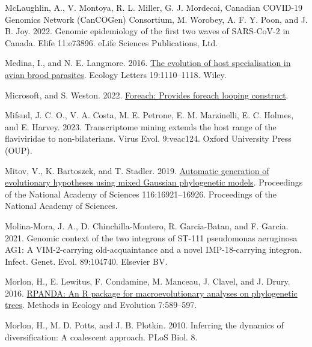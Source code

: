\documentclass[fleqn,10pt,lineno]{wlpeerj} %
\newlength{\cslhangindent}
\newlength{\cslentryspacingunit} %
\newenvironment{CSLReferences}[2] %
 {%
  \setlength{\parindent}{0pt}
  \ifodd #1
  \let\oldpar\par
  \def\par{\hangindent=\cslhangindent\oldpar}
  \fi
  \setlength{\parskip}{#2\cslentryspacingunit}
 }%
 {}
\begin{document}
\begin{CSLReferences}{1}{0}
\leavevmode{}%
McLaughlin, A., V. Montoya, R. L. Miller, G. J. Mordecai, Canadian COVID-19 Genomics Network (CanCOGen) Consortium, M. Worobey, A. F. Y. Poon, and J. B. Joy. 2022. Genomic epidemiology of the first two waves of {SARS-CoV-2} in {C}anada. Elife 11:e73896. eLife Sciences Publications, Ltd.

\leavevmode{}%
Medina, I., and N. E. Langmore. 2016. \href{https://doi.org/10.1111/ele.12649}{The evolution of host specialisation in avian brood parasites}. Ecology Letters 19:1110--1118. Wiley.

\leavevmode{}%
Microsoft, and S. Weston. 2022. \href{https://CRAN.R-project.org/package=foreach}{Foreach: Provides foreach looping construct}.

\leavevmode{}%
Mifsud, J. C. O., V. A. Costa, M. E. Petrone, E. M. Marzinelli, E. C. Holmes, and E. Harvey. 2023. Transcriptome mining extends the host range of the flaviviridae to non-bilaterians. Virus Evol. 9:veac124. Oxford University Press (OUP).

\leavevmode{}%
Mitov, V., K. Bartoszek, and T. Stadler. 2019. \href{https://doi.org/10.1073/pnas.1813823116}{Automatic generation of evolutionary hypotheses using mixed {G}aussian phylogenetic models}. Proceedings of the National Academy of Sciences 116:16921--16926. Proceedings of the National Academy of Sciences.

\leavevmode{}%
Molina-Mora, J. A., D. Chinchilla-Montero, R. Garcia-Batan, and F. Garcia. 2021. Genomic context of the two integrons of {ST-111} pseudomonas aeruginosa {AG1}: A {VIM-2-carrying} old-acquaintance and a novel {IMP-18-carrying} integron. Infect. Genet. Evol. 89:104740. Elsevier BV.

\leavevmode{}%
Morlon, H., E. Lewitus, F. Condamine, M. Manceau, J. Clavel, and J. Drury. 2016. \href{https://CRAN.R-project.org/package=RPANDA}{RPANDA: An {R} package for macroevolutionary analyses on phylogenetic trees}. Methods in Ecology and Evolution 7:589--597.

\leavevmode{}%
Morlon, H., M. D. Potts, and J. B. Plotkin. 2010. Inferring the dynamics of diversification: A coalescent approach. PLoS Biol. 8.


\end{CSLReferences}
\end{document}
